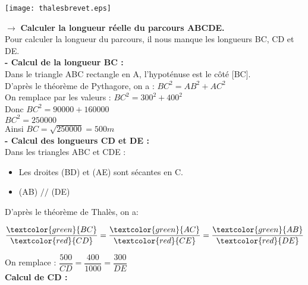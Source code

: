 \documentclass[a4paper,11pt]{article}
\newcommand{\bi}{\begin{itemize}}
\newcommand{\ei}{\end{itemize}}
\begin{document}
\begin{center}
\texttt{[image: thalesbrevet.eps]} 
\end{center}

$\rightarrow$ \textbf{ Calculer la longueur réelle du parcours ABCDE.}\\

\color{red}
Pour calculer la longueur du parcours, il nous manque les longueurs BC, CD et DE.\\

\textbf{- Calcul de la longueur BC :}\\

Dans le triangle ABC rectangle en A, l'hypoténuse est le côté [BC].\\

D'après le théorème de Pythagore, on a : \hspace*{1cm} $BC^{2}=AB^{2}+AC^{2}$\\

On remplace par les valeurs : $BC^{2}=300^{2}+400^{2}$\\

Donc  $BC^{2}=90 000+160 000$\\

 $BC^{2}=250 000$\\
 
  Ainsi  $BC= \sqrt{250 000}=500 m$\\ 


\textbf{- Calcul des longueurs CD et DE :}\\



Dans les triangles ABC et CDE :
\bi
\item Les droites (BD) et (AE) sont sécantes en C.
\item (AB) $\slash\slash$ (DE)
\ei

D'après le théorème de Thalès, on a:

\begin{center}
$\dfrac{\textcolor{green}{BC}}{\textcolor{red}{CD}}=\dfrac{\textcolor{green}{AC}}{\textcolor{red}{CE}}=\dfrac{\textcolor{green}{AB}}{\textcolor{red}{DE}}$\\
\end{center}
 



On remplace : \hspace*{1cm} $\dfrac{500}{CD}=\dfrac{400}{1000}=\dfrac{300}{DE}$\\


\textbf{Calcul de CD :}\\
\end{document}
